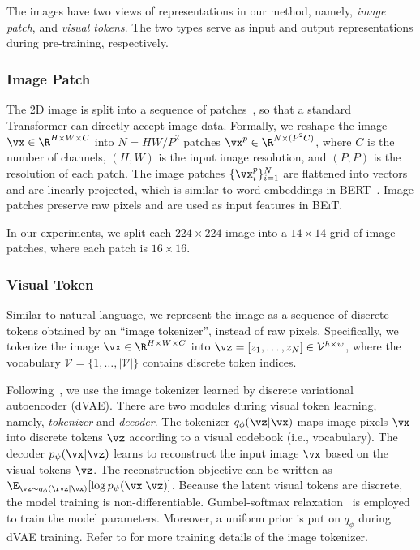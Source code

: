 \documentclass{article}
\newcommand\our{\textsc{BEiT}}
\begin{document}
The images have two views of representations in our method, namely, \textit{image patch}, and \textit{visual tokens}.
The two types serve as input and output representations during pre-training, respectively.

\subsubsection{Image Patch}
\label{sec:image:patch}

The 2D image is split into a sequence of patches~\citep{vit}, so that a standard Transformer can directly accept image data.
Formally, we reshape the image $\vx \in \R^{H \times W \times C}$ into $N={HW}/{P^2}$ patches $\vx^{p} \in \R^{N \times (P^2 C)}$, where $C$ is the number of channels, $(H, W)$ is the input image resolution, and $(P, P)$ is the resolution of each patch.
The image patches $\{ \vx^{p}_{i} \}_{i=1}^{N}$ are flattened into vectors and are linearly projected, which is similar to word embeddings in BERT~\citep{bert}.
Image patches preserve raw pixels and are used as input features in \our{}.

In our experiments, we split each $224 \times 224$ image into a $14 \times 14$ grid of image patches, where each patch is $16 \times 16$.

\subsubsection{Visual Token}
\label{sec:visual:token}

Similar to natural language, we represent the image as a sequence of discrete tokens obtained by an ``image tokenizer'', instead of raw pixels.
Specifically, we tokenize the image $\vx \in \R^{H \times W \times C}$ into $\vz = [z_1, \dots, z_N] \in \mathcal{V}^{h \times w}$, where the vocabulary $\mathcal{V} = \{ 1, \dots, |\mathcal{V}| \}$ contains discrete token indices.

Following~\citep{dalle}, we use the image tokenizer learned by discrete variational autoencoder (dVAE).
There are two modules during visual token learning, namely, \textit{tokenizer} and \textit{decoder}.
The tokenizer $q_{\phi}( \vz|\vx)$ maps image pixels $\vx$ into discrete tokens $\vz$ according to a visual codebook (i.e., vocabulary).
The decoder $p_{\psi}(\vx|\vz)$ learns to reconstruct the input image $\vx$ based on the visual tokens $\vz$.
The reconstruction objective can be written as $\E_{\vz\sim q_{\phi}( \rvz|\vx)}[\log p_{\psi}(\vx|\vz)]$.
% 
Because the latent visual tokens are discrete, the model training is non-differentiable.
Gumbel-softmax relaxation~\citep{gumbel:Jang,gumbel:Maddison} is employed to train the model parameters.
Moreover, a uniform prior is put on $q_{\phi}$ during dVAE training.
Refer to \citep{dalle} for more training details of the image tokenizer.
\end{document}
